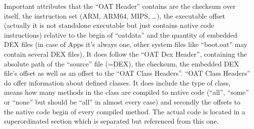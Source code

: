 Important attributes that the ``OAT Header'' contains are the
checksum over itself,
the instruction set (ARM, ARM64, MIPS, \ldots), the executable
offset (actually it is not standalone executable but just contains
native code instructions)
relative to the begin of ``oatdata'' and the quantity of embedded
DEX files (in case of Apps it's always one, other system files like
``boot.oat'' may contain several DEX files). It does follow the
``OAT Dex Header'', containing
the absolute path of the ``source'' file (=DEX), the checksum, the
embedded DEX file's offset as well as
an offset to the ``OAT Class Headers''. ``OAT Class Headers''
do offer information about defined classes. It does include the type
of class, means how many methods in the class
are compiled to native code (``all'', ``some'' or ``none'' but
should be ``all'' in almost every case) and secondly
the offsets to the native code begin of every compiled method.
The actual code is located in a superordinated section
 which is separated but referenced from this one.

